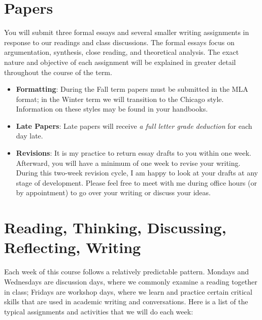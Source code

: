 \documentclass[letterpaper]{article}
\begin{document}
\section*{Papers}
You will submit three formal essays and several smaller writing assignments in response to our readings and class discussions. The formal essays focus on argumentation, synthesis, close reading, and theoretical analysis. The exact nature and objective of each assignment will be explained in greater detail throughout the course of the term. 

\begin{itemize}

\item \textbf{Formatting}: During the Fall term papers must be submitted in the MLA format; in the Winter term we will transition to the Chicago style. Information on these styles may be found in your handbooks.
\item \textbf{Late Papers}: Late papers will receive \emph{a full letter grade deduction} for each day late.

\item \textbf{Revisions}: It is my practice to return essay drafts to you within one week. Afterward, you will have a minimum of one week to revise your writing. During this two-week revision cycle, I am happy to look at your drafts at any stage of development. Please feel free to meet with me during office hours (or by appointment) to go over your writing or discuss your ideas.
\end{itemize}


\section*{Reading, Thinking, Discussing, Reflecting, Writing}

Each week of this course follows a relatively predictable pattern. Mondays and Wednesdays are discussion days, where we commonly examine a reading together in class; Fridays are workshop days, where we learn and practice certain critical skills that are used in academic writing and conversations. Here is a list of the typical assignments and activities that we will do each week: 
\end{document}
